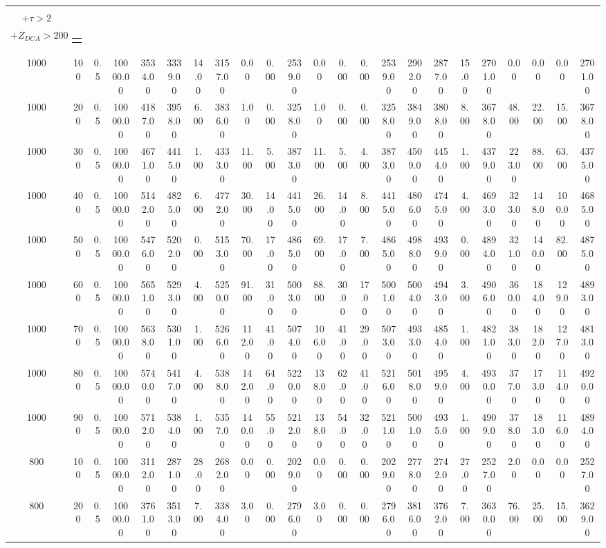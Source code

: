 \documentclass[8pt]{extarticle}
\begin{document}
\begin{longtable}{|c|c|c|c|c|c|c|c|c|c|c|c|c|c|c|c|c|c|c|c|c|c|c|}
\begin{tabular}{@{}c@{}} $E_T^{miss} > 75$ \\ $+ \tau > 2$ \\ $+Z_{DCA} > 200$\end{tabular} & \begin{tabular}{@{}c@{}} $E_{T}^{miss} > 75$ $+ \tau < 4$ \end{tabular} \\ 
\hline 
1000&100&0.5&10000.00&3534.00&3339.00&14.00&3157.00&0.00&0.00&2539.00&0.00&0.00&0.00&2539.00&2902.00&2877.00&15.00&2701.00&0.00&0.00&0.00&2701.00\\ 
\hline 
1000&200&0.5&10000.00&4187.00&3958.00&6.00&3836.00&1.00&0.00&3258.00&1.00&0.00&0.00&3258.00&3849.00&3808.00&8.00&3678.00&48.00&22.00&15.00&3678.00\\ 
\hline 
1000&300&0.5&10000.00&4671.00&4415.00&1.00&4333.00&11.00&5.00&3873.00&11.00&5.00&4.00&3873.00&4509.00&4454.00&1.00&4379.00&223.00&88.00&63.00&4375.00\\ 
\hline 
1000&400&0.5&10000.00&5142.00&4825.00&6.00&4772.00&30.00&14.00&4415.00&26.00&14.00&8.00&4415.00&4806.00&4745.00&4.00&4693.00&323.00&148.00&100.00&4685.00\\ 
\hline 
1000&500&0.5&10000.00&5476.00&5202.00&0.00&5153.00&70.00&17.00&4865.00&69.00&17.00&7.00&4865.00&4988.00&4939.00&0.00&4894.00&321.00&140.00&82.00&4875.00\\ 
\hline 
1000&600&0.5&10000.00&5651.00&5293.00&4.00&5250.00&91.00&31.00&5003.00&88.00&30.00&17.00&5001.00&5004.00&4943.00&3.00&4906.00&360.00&184.00&129.00&4893.00\\ 
\hline 
1000&700&0.5&10000.00&5638.00&5301.00&1.00&5266.00&112.00&41.00&5074.00&106.00&41.00&29.00&5073.00&4933.00&4854.00&1.00&4821.00&383.00&182.00&127.00&4813.00\\ 
\hline 
1000&800&0.5&10000.00&5740.00&5417.00&4.00&5388.00&142.00&64.00&5220.00&138.00&62.00&41.00&5216.00&5018.00&4959.00&4.00&4930.00&377.00&173.00&114.00&4920.00\\ 
\hline 
1000&900&0.5&10000.00&5712.00&5384.00&1.00&5357.00&140.00&55.00&5212.00&138.00&54.00&32.00&5211.00&5001.00&4935.00&1.00&4909.00&378.00&183.00&116.00&4894.00\\ 
\hline 
800&100&0.5&10000.00&3112.00&2871.00&28.00&2682.00&0.00&0.00&2029.00&0.00&0.00&0.00&2029.00&2778.00&2742.00&27.00&2527.00&2.00&0.00&0.00&2527.00\\ 
\hline 
800&200&0.5&10000.00&3761.00&3513.00&7.00&3384.00&3.00&0.00&2796.00&3.00&0.00&0.00&2796.00&3816.00&3762.00&7.00&3630.00&76.00&25.00&15.00&3629.00\\ 

\end{longtable}
\end{document}
